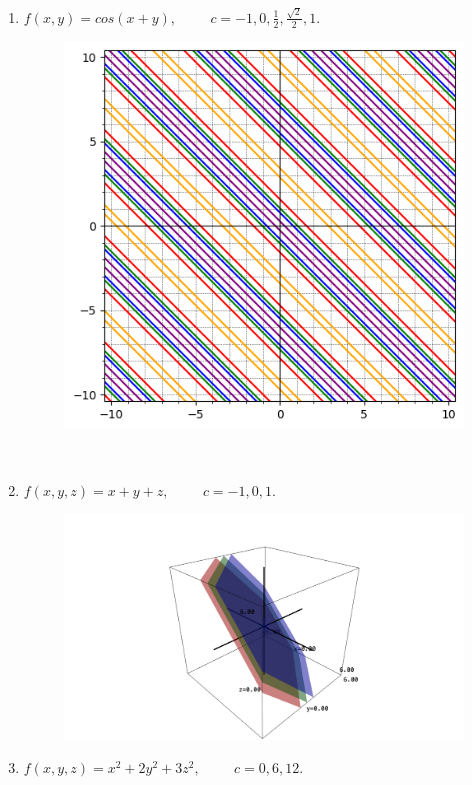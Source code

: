 \documentclass{article}
\begin{document}
\begin{enumerate}
\begin{enumerate}[label=1.\arabic*.]
\begin{enumerate}[label=(\alph*)]
\begin{figure}[!ht]
            \end{figure}
            \item $f(x, y) = cos(x+y), \hspace{1cm} c = -1, 0, \frac{1}{2}, \frac{\sqrt{2}}{2}, 1.$
            \begin{figure}[!ht]
                \centering 
                \includegraphics[width=0.7\linewidth]{nivel3.png} 
                \label{fig:imagem1}
            \end{figure} \\
            \item $f(x, y, z) = x + y + z, \hspace{1cm} c = -1, 0, 1.$
            \begin{figure}[!ht]
                \centering 
                \includegraphics[width=0.7\linewidth]{nivel4.png} 
                \label{fig:imagem1}
            \end{figure}
            \item $f(x, y, z) = x^2 + 2y^2 + 3z^2, \hspace{1cm} c = 0, 6, 12.$
            \begin{figure}[!ht]
                \centering 

\end{figure}
\end{enumerate}
\end{enumerate}
\end{enumerate}
\end{document}
